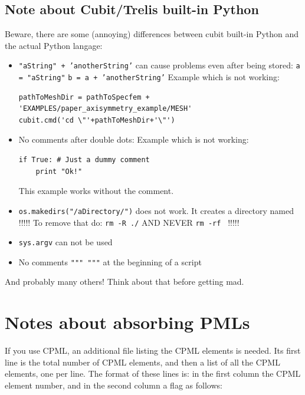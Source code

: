 \subsection{Note about Cubit/Trelis built-in Python}
Beware, there are some (annoying) differences between cubit built-in Python and the actual Python langage:
\begin{itemize}
\item \texttt{"aString" + 'anotherString'} can cause problems even after being stored: \newline
      \texttt{a = "aString"} \newline
      \texttt{b = a + 'anotherString'} \newline
      Example which is not working:
\begin{verbatim}
pathToMeshDir = pathToSpecfem + 'EXAMPLES/paper_axisymmetry_example/MESH'
cubit.cmd('cd \"'+pathToMeshDir+'\"')
\end{verbatim}
\item No comments after double dots: \newline
      Example which is not working:
\begin{verbatim}
if True: # Just a dummy comment
    print "Ok!"
\end{verbatim}
      This example works without the comment.
\item \texttt{os.makedirs("\texttildelow/aDirectory/")} does not work. It creates a directory named \texttt{\texttildelow} \newline
       !!!!! To remove that do: \texttt{rm -R ./\texttildelow} AND NEVER \texttt{rm -rf \texttildelow} !!!!!
\item \texttt{sys.argv} can not be used
\item No comments \texttt{""" """} at the beginning of a script
\end{itemize}
And probably many others! Think about that before getting mad.

\section{Notes about absorbing PMLs}
If you use CPML, an additional file listing the CPML elements is needed.
Its first line is the total number of
CPML elements, and then a list of all the CPML elements, one per line.
The format of these lines is: in the first column the CPML element number, and in the second column a flag as follows:

